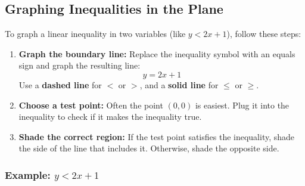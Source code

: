 \documentclass[11pt]{article}
\begin{document}
\subsection{Graphing Inequalities in the Plane}

To graph a linear inequality in two variables (like \( y < 2x + 1 \)), follow these steps:

\begin{enumerate}
  \item \textbf{Graph the boundary line:}
  Replace the inequality symbol with an equals sign and graph the resulting line:
  \[
  y = 2x + 1
  \]
  Use a \textbf{dashed line} for \( < \) or \( > \), and a \textbf{solid line} for \( \leq \) or \( \geq \).

  \item \textbf{Choose a test point:}
  Often the point \( (0, 0) \) is easiest. Plug it into the inequality to check if it makes the inequality true.

  \item \textbf{Shade the correct region:}
  If the test point satisfies the inequality, shade the side of the line that includes it. Otherwise, shade the opposite side.
\end{enumerate}

\subsubsection*{Example: \( y < 2x + 1 \)}

\begin{center}
\end{center}
\end{document}
